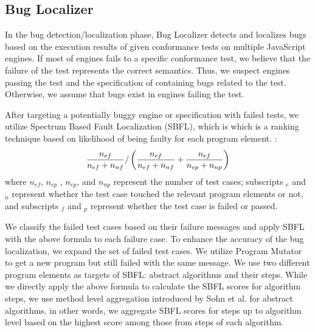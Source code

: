 \subsection{Bug Localizer}

In the bug detection/localization phase, \textsf{Bug Localizer} detects and
localizes bugs based on the execution results of given conformance tests on
multiple JavaScript engines.  If most of engines fails to a specific
conformance test, we believe that the failure of the test represents the
correct semantics.  Thus, we suspect engines passing the test and the
specification of containing bugs related to the test.  Otherwise, we assume
that bugs exist in engines failing the test.

After targeting a potentially buggy engine or specification with failed tests,
we utilize Spectrum Based Fault Localization (SBFL)\cite{sbfl-survey}, which is
which is a ranking technique based on likelihood of being faulty for each
program element.  :
\[
  {{n_{ef}}\over{n_{ef} + n_{nf}}} /
  \left(
    {{n_{ef}}\over{n_{ef} + n_{nf}}} +
    {{n_{ef}}\over{n_{ep} + n_{np}}}
  \right)
\]
where $n_{ef}$, $n_{ep}$ , $n_{ep}$, and $n_{np}$ represent the number of test
cases; subscripts ${}_e$ and ${}_n$ represent whether the test case touched the
relevant program elements or not, and subscripts ${}_f$ and ${}_p$ represent
whether the test case is failed or passed.

We classify the failed test cases based on their failure messages and apply SBFL
with the above formula to each failure case.  To enhance the accuracy of the bug
localization, we expand the set of failed test cases.  We utilize
\textsf{Program Mutator} to get a new program but still failed with the same
message.  We use two different program elements as targets of SBFL: abstract
algorithms and their steps.  While we directly apply the above formula to
calculate the SBFL scores for algorithm steps, we use method level aggregation
introduced by Sohn et al.\cite{fluccs} for abstract algorithms.  in other
words, we aggregate SBFL scores for steps up to algorithm level based on the
highest score among those from steps of each algorithm.
